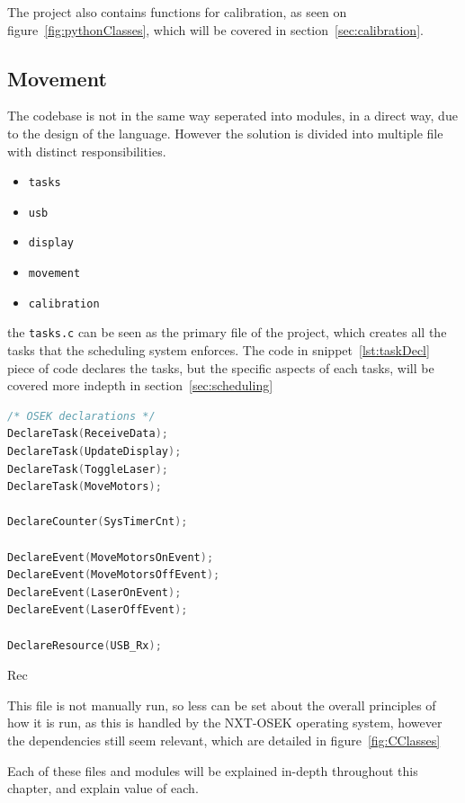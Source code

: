 The project also contains functions for calibration, as seen on figure~\ref{fig:pythonClasses}, which will be covered in section~\ref{sec:calibration}.


\subsection{Movement}
The codebase is not in the same way seperated into modules, in a direct way, due to the design of the language. However the solution is divided into multiple file with distinct responsibilities.

\begin{itemize}
	\item \texttt{tasks}
	\item \texttt{usb}
	\item \texttt{display}
	\item \texttt{movement}
	\item \texttt{calibration}
\end{itemize}

the \texttt{tasks.c} can be seen as the primary file of the project, which creates all the tasks that the scheduling system enforces.
The code in snippet~\ref{lst:taskDecl} piece of code declares the tasks, but the specific aspects of each tasks, will be covered more indepth in section~\ref{sec:scheduling}
\begin{lstlisting}[language={c},label={lst:taskDecl},caption={Declaration of tasks, counters and events}]
/* OSEK declarations */
DeclareTask(ReceiveData);
DeclareTask(UpdateDisplay);
DeclareTask(ToggleLaser);
DeclareTask(MoveMotors);

DeclareCounter(SysTimerCnt);

DeclareEvent(MoveMotorsOnEvent);
DeclareEvent(MoveMotorsOffEvent);
DeclareEvent(LaserOnEvent);
DeclareEvent(LaserOffEvent);

DeclareResource(USB_Rx);
\end{lstlisting}
Rec


This file is not manually run, so less can be set about the overall principles of how it is run, as this is handled by the NXT-OSEK operating system, however the dependencies still seem relevant, which are detailed in figure~\ref{fig:CClasses}


Each of these files and modules will be explained in-depth throughout this chapter, and explain value of each.

\
